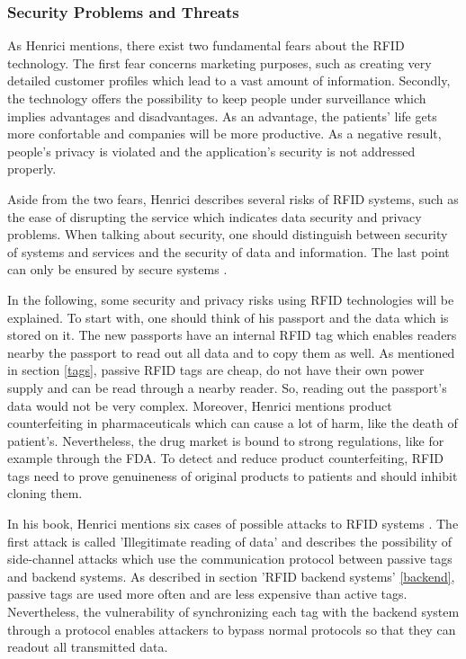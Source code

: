 \subsubsection{Security Problems and Threats} \label{problems}
 
As Henrici \cite{henrici} mentions, there exist two fundamental fears about the RFID technology. The first fear concerns marketing purposes, such as creating very detailed customer profiles which lead to a vast amount of information. Secondly, the technology offers the possibility to keep people under surveillance which implies advantages and disadvantages. As an advantage, the patients' life gets more confortable and companies will be more productive. As a negative result, people's privacy is violated and the application's security is not addressed properly.

Aside from the two fears, Henrici describes several risks of RFID systems, such as the ease of disrupting the service which indicates data security and privacy problems. When talking about security, one should distinguish between security of systems and services and the security of data and information. The last point can only be ensured by secure systems \cite{henrici}. 

In the following, some security and privacy risks using RFID technologies will be explained. To start with, one should think of his passport and the data which is stored on it. The new passports have an internal RFID tag which enables readers nearby the passport to read out all data and to copy them as well. As mentioned in section \ref{tags}, passive RFID tags are cheap, do not have their own power supply and can be read through a nearby reader. So, reading out the passport's data would not be very complex.
Moreover, Henrici mentions product counterfeiting in pharmaceuticals which can cause a lot of harm, like the death of patient's. Nevertheless, the drug market is bound to strong regulations, like for example through the \ac{FDA}. To detect and reduce product counterfeiting, RFID tags need to prove genuineness of original products to patients and should inhibit cloning them.

In his book, Henrici mentions six cases of possible attacks to RFID systems \cite[p.61 ff.]{henrici}. The first attack is called 'Illegitimate reading of data' and describes the possibility of side-channel attacks which use the communication protocol between passive tags and backend systems. As described in section 'RFID backend systems' \ref{backend}, passive tags are used more often and are less expensive than active tags. Nevertheless, the vulnerability of synchronizing each tag with the backend system through a protocol enables attackers to bypass normal protocols so that they can readout all transmitted data.


